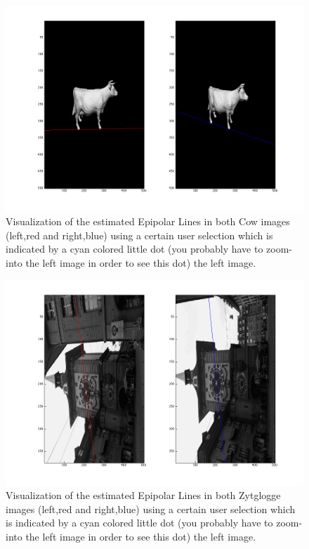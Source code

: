 \documentclass{paper}
\begin{document}
\begin{figure}[H]
\centering
\includegraphics[width=\textwidth]{figures/epipolar_lines_cow}
\caption{Visualization of the estimated Epipolar Lines in both Cow images (left,red and right,blue) using a certain user selection which is indicated by a cyan colored little dot (you probably have to zoom-into the left image in order to see this dot) the left image.}
\label{fig:cow_epipolarline}
\end{figure}

\begin{figure}[H]
\centering
\includegraphics[width=\textwidth]{figures/epi_zyt_1}
\caption{Visualization of the estimated Epipolar Lines in both Zytglogge images (left,red and right,blue) using a certain user selection which is indicated by a cyan colored little dot (you probably have to zoom-into the left image in order to see this dot) the left image.}
\label{fig:zyt_epipolarline_1}
\end{figure}
\end{document}
